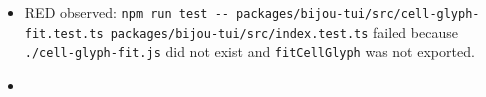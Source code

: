 \begin{itemize}
\tightlist
\item
  RED observed: \texttt{n\allowbreak{}p\allowbreak{}m\allowbreak{} \allowbreak{}r\allowbreak{}u\allowbreak{}n\allowbreak{} \allowbreak{}t\allowbreak{}e\allowbreak{}s\allowbreak{}t\allowbreak{} \allowbreak{}-\allowbreak{}-\allowbreak{} \allowbreak{}p\allowbreak{}a\allowbreak{}c\allowbreak{}k\allowbreak{}a\allowbreak{}g\allowbreak{}e\allowbreak{}s\allowbreak{}/\allowbreak{}b\allowbreak{}i\allowbreak{}j\allowbreak{}o\allowbreak{}u\allowbreak{}-\allowbreak{}t\allowbreak{}u\allowbreak{}i\allowbreak{}/\allowbreak{}s\allowbreak{}r\allowbreak{}c\allowbreak{}/\allowbreak{}c\allowbreak{}e\allowbreak{}l\allowbreak{}l\allowbreak{}-\allowbreak{}g\allowbreak{}l\allowbreak{}y\allowbreak{}p\allowbreak{}h\allowbreak{}-\allowbreak{}f\allowbreak{}i\allowbreak{}t\allowbreak{}.\allowbreak{}t\allowbreak{}e\allowbreak{}s\allowbreak{}t\allowbreak{}.\allowbreak{}t\allowbreak{}s\allowbreak{} \allowbreak{}p\allowbreak{}a\allowbreak{}c\allowbreak{}k\allowbreak{}a\allowbreak{}g\allowbreak{}e\allowbreak{}s\allowbreak{}/\allowbreak{}b\allowbreak{}i\allowbreak{}j\allowbreak{}o\allowbreak{}u\allowbreak{}-\allowbreak{}t\allowbreak{}u\allowbreak{}i\allowbreak{}/\allowbreak{}s\allowbreak{}r\allowbreak{}c\allowbreak{}/\allowbreak{}i\allowbreak{}n\allowbreak{}d\allowbreak{}e\allowbreak{}x\allowbreak{}.\allowbreak{}t\allowbreak{}e\allowbreak{}s\allowbreak{}t\allowbreak{}.\allowbreak{}t\allowbreak{}s} failed because \texttt{.\allowbreak{}/\allowbreak{}c\allowbreak{}e\allowbreak{}l\allowbreak{}l\allowbreak{}-\allowbreak{}g\allowbreak{}l\allowbreak{}y\allowbreak{}p\allowbreak{}h\allowbreak{}-\allowbreak{}f\allowbreak{}i\allowbreak{}t\allowbreak{}.\allowbreak{}j\allowbreak{}s} did not exist and \texttt{f\allowbreak{}i\allowbreak{}t\allowbreak{}C\allowbreak{}e\allowbreak{}l\allowbreak{}l\allowbreak{}G\allowbreak{}l\allowbreak{}y\allowbreak{}p\allowbreak{}h} was not exported.
\item

\end{itemize}
